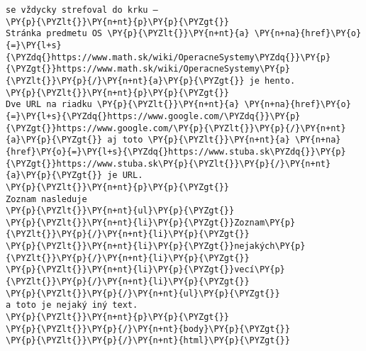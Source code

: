 \begin{Verbatim}[commandchars=\\\{\}]
se vždycky strefoval do krku –
\PY{p}{\PYZlt{}}\PY{n+nt}{p}\PY{p}{\PYZgt{}}
Stránka predmetu OS \PY{p}{\PYZlt{}}\PY{n+nt}{a} \PY{n+na}{href}\PY{o}{=}\PY{l+s}{\PYZdq{}https://www.math.sk/wiki/OperacneSystemy\PYZdq{}}\PY{p}{\PYZgt{}}https://www.math.sk/wiki/OperacneSystemy\PY{p}{\PYZlt{}}\PY{p}{/}\PY{n+nt}{a}\PY{p}{\PYZgt{}} je hento.
\PY{p}{\PYZlt{}}\PY{n+nt}{p}\PY{p}{\PYZgt{}}
Dve URL na riadku \PY{p}{\PYZlt{}}\PY{n+nt}{a} \PY{n+na}{href}\PY{o}{=}\PY{l+s}{\PYZdq{}https://www.google.com/\PYZdq{}}\PY{p}{\PYZgt{}}https://www.google.com/\PY{p}{\PYZlt{}}\PY{p}{/}\PY{n+nt}{a}\PY{p}{\PYZgt{}} aj toto \PY{p}{\PYZlt{}}\PY{n+nt}{a} \PY{n+na}{href}\PY{o}{=}\PY{l+s}{\PYZdq{}https://www.stuba.sk\PYZdq{}}\PY{p}{\PYZgt{}}https://www.stuba.sk\PY{p}{\PYZlt{}}\PY{p}{/}\PY{n+nt}{a}\PY{p}{\PYZgt{}} je URL.
\PY{p}{\PYZlt{}}\PY{n+nt}{p}\PY{p}{\PYZgt{}}
Zoznam nasleduje
\PY{p}{\PYZlt{}}\PY{n+nt}{ul}\PY{p}{\PYZgt{}}
\PY{p}{\PYZlt{}}\PY{n+nt}{li}\PY{p}{\PYZgt{}}Zoznam\PY{p}{\PYZlt{}}\PY{p}{/}\PY{n+nt}{li}\PY{p}{\PYZgt{}}
\PY{p}{\PYZlt{}}\PY{n+nt}{li}\PY{p}{\PYZgt{}}nejakých\PY{p}{\PYZlt{}}\PY{p}{/}\PY{n+nt}{li}\PY{p}{\PYZgt{}}
\PY{p}{\PYZlt{}}\PY{n+nt}{li}\PY{p}{\PYZgt{}}vecí\PY{p}{\PYZlt{}}\PY{p}{/}\PY{n+nt}{li}\PY{p}{\PYZgt{}}
\PY{p}{\PYZlt{}}\PY{p}{/}\PY{n+nt}{ul}\PY{p}{\PYZgt{}}
a toto je nejaký iný text.
\PY{p}{\PYZlt{}}\PY{n+nt}{p}\PY{p}{\PYZgt{}}
\PY{p}{\PYZlt{}}\PY{p}{/}\PY{n+nt}{body}\PY{p}{\PYZgt{}}
\PY{p}{\PYZlt{}}\PY{p}{/}\PY{n+nt}{html}\PY{p}{\PYZgt{}}
\end{Verbatim}
